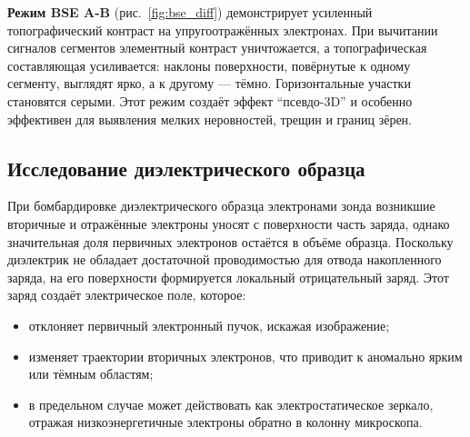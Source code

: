 \documentclass[12pt, a4paper]{article}
\begin{document}
\textbf{Режим BSE A-B} (рис.~\ref{fig:bse_diff}) демонстрирует усиленный топографический контраст на упругоотражённых электронах. При вычитании сигналов сегментов элементный контраст уничтожается, а топографическая составляющая усиливается: наклоны поверхности, повёрнутые к одному сегменту, выглядят ярко, а к другому --- тёмно. Горизонтальные участки становятся серыми. Этот режим создаёт эффект ``псевдо-3D'' и особенно эффективен для выявления мелких неровностей, трещин и границ зёрен.








\subsection*{Исследование диэлектрического образца}



При бомбардировке диэлектрического образца электронами зонда возникшие вторичные и отражённые электроны уносят с поверхности часть заряда, однако значительная доля первичных электронов остаётся в объёме образца. Поскольку диэлектрик не обладает достаточной проводимостью для отвода накопленного заряда, на его поверхности формируется локальный отрицательный заряд. Этот заряд создаёт электрическое поле, которое:
\begin{itemize}
    \item отклоняет первичный электронный пучок, искажая изображение;
    \item изменяет траектории вторичных электронов, что приводит к аномально ярким или тёмным областям;
    \item в предельном случае может действовать как электростатическое зеркало, отражая низкоэнергетичные электроны обратно в колонну микроскопа.
\end{itemize}
\end{document}
